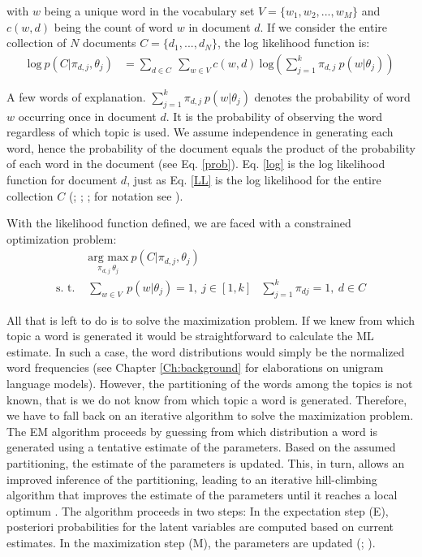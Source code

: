 \documentclass[11pt,a4paper,english,oneside]{book}
\numberwithin{equation}{chapter}
\begin{document}
\noindent with $w$ being a unique word in the vocabulary set $V = \{w_1, w_2, ..., w_M\}$ and $c(w,d)$ being the count of word $w$ in document $d$. If we consider the entire collection of $N$ documents $C=\{d_1,...,d_N\}$, the log likelihood function is:
\begin{align}
\label{LL} \text{log} \ p(C|\pi_{d,j},\theta_j) &= \underset{d \in C}{\sum} \ \underset{w \in V}\sum c(w,d) \ \text{log} \left( \sum_{j=1}^{k}\pi_{d,j} \ p(w|\theta_j) \right)
\end{align}


A few words of explanation. $\sum_{j=1}^{k}\pi_{d,j} \ p(w|\theta_j)$ denotes the probability of word $w$ occurring once in document $d$. It is the probability of observing the word regardless of which topic is used. We assume independence in generating each word, hence the probability of the document equals the product of the probability of each word in the document (see Eq. \ref{prob}). Eq. \ref{log} is the log likelihood function for document $d$, just as Eq. \ref{LL} is the log likelihood for the entire collection $C$ (\citealp{Hofmann.1999}; \citeyear{Hofmann.2001}; \citealp{Steyvers(2007)}; for notation see \citealp[~p. 340--377]{Zhai.2016}).

With the likelihood function defined, we are faced with a constrained optimization problem:
\begin{align}\label{argmax}
 & \underset{\pi_{d,j} \ \theta_j}{\text{arg max}} \ p(C|\pi_{d,j},\theta_j) &\\
\label{constraints} \text{s. t. } & \underset{w \in V}{\sum} \ p(w | \theta_j) = 1, \  j \in [1,k] &  \sum_{j=1}^{k} \pi_{dj} = 1, \ d \in C
\end{align}

All that is left to do is to solve the maximization problem. If we knew from which topic a word is generated it would be straightforward to calculate the ML estimate. In such a case, the word distributions would simply be the normalized word frequencies (see Chapter \ref{Ch:background} for elaborations on unigram language models). However, the partitioning of the words among the topics is not known, that is we do not know from which topic a word is generated. Therefore, we have to fall back on an iterative algorithm to solve the maximization problem. The EM algorithm proceeds by guessing from which distribution a word is generated using a tentative estimate of the parameters. Based on the assumed partitioning, the estimate of the parameters is updated. This, in turn, allows an improved inference of the partitioning, leading to an iterative hill-climbing algorithm that improves the estimate of the parameters until it reaches a local optimum \cite[p. 360]{Zhai.2016}. The algorithm proceeds in two steps: In the expectation step (E), posteriori probabilities for the latent variables are computed based on current estimates. In the maximization step (M), the parameters are updated (\citealp[p. 290]{Hofmann.1999}; \citeyear[pp. 181--182]{Hofmann.1999}). 
\end{document}
